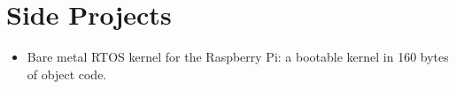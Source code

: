 \section*{Side Projects}
\vspace{-2mm}

\begin{itemize}
    \item Bare metal RTOS kernel for the Raspberry Pi: a bootable kernel
        in 160 bytes of object code.
    \end{itemize}

